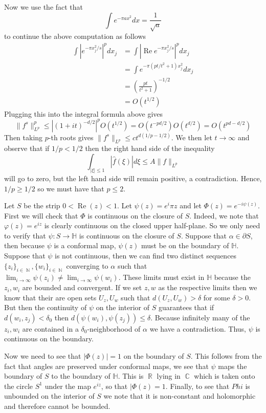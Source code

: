 \documentclass[11pt]{article}
\DeclareMathOperator{\N}{\mathbb{N}}
\DeclareMathOperator{\R}{\mathbb{R}}
\DeclareMathOperator{\C}{\mathbb{C}}
\newcommand{\exercise}[1]{\noindent{\textbf{Exercise #1:}}}
\newcommand{\lpnorm}[2]{\|#1\|_{L^{#2}}}
\newcommand{\real}{\mathrel{\text{Re}}}
\begin{document}
Now we use the fact that
\[
\int e^{-\pi ax^2}dx = \frac{1}{\sqrt{a}}
\]
to continue the above computation as follows
\begin{align*}
  \int \left|e^{-\pi x_j^2/s}\right|^pdx_j &= \int \left|\real e^{-\pi
      x_j^2/s}\right|^pdx_j \\
  &= \int e^{-\pi (pt/t^2+1)x_j^2}dx_j \\
  &= \left(\frac{pt}{t^2+1}\right)^{-1/2}\\
  &= O(t^{1/2})
\end{align*}
Plugging this into the integral formula above gives
\[
\lpnorm{f^s}{p}^p \leq |(1+it)^{-d/2}|^pO(t^{1/2}) =
O(t^{-pd/2})O(t^{d/2}) = O(t^{pd - d/2})
\]
Then taking $p$-th roots gives $\lpnorm{f^s}{p} \leq ct^{d(1/p -
  1/2)}$. We then let $t \to \infty$ and observe that if $1/p < 1/2$
then the right hand side of the inequality
\[
\int_{|\xi| \leq 1} |\hat{f}(\xi)|d\xi \leq A\lpnorm{f}{p}
\]
will go to zero, but the left hand side will remain positive, a
contradiction. Hence, $1/p \geq 1/2$ so we must have that $p \leq 2$.

\exercise{2.7.5}

Let $S$ be the strip $0 < \real (z) < 1$. Let $\psi(z) = e^i\pi z$ and
let $\Phi(z) = e^{-i\psi(z)}$. First we will check that $\Phi$ is
continuous on the closure of $S$. Indeed, we note that $\varphi (z)=
e^{iz}$ is clearly continuous on the closed upper half-plane. So we
only need to verify that $\psi: S \to \mathbb{H}$ is continuous on the
closure of $S$. Suppose that $\alpha \in \partial S$, then because
$\psi$ is a conformal map, $\psi(z)$ must be on the boundary of
$\mathbb{H}$. Suppose that $\psi$ is not continuous, then we can find
two distinct sequences $\{z_i\}_{i \in \N}, \{w_i\}_{i \in \N}$
converging to $\alpha$ such that $\lim_{i \to \infty} \psi(z_i) \neq
\lim_{i \to \infty} \psi(w_i)$. These limits must exist in
$\mathbb{H}$ because the $z_i,w_i$ are bounded and convergent. If we
set $z,w$ as the respective limits then we know that their are open
sets $U_z,U_w$ such that $d(U_z,U_w) > \delta$ for some $\delta >
0$. But then the continuity of $\psi$ on the interior of $S$
guarantees that if $d(w_i,z_j) < \delta_0$ then $d(\psi(w_i),
\psi(z_j)) \leq \delta$. Because infinitely many of the $z_i,w_i$ are
contained in a $\delta_0$-neighborhood of $\alpha$ we have a
contradiction. Thus, $\psi$ is continuous on the boundary.

Now we need to see that $|\Phi(z)| = 1$ on the boundary of $S$. This
follows from the fact that angles are preserved under conformal maps,
we see that $\psi$ maps the boundary of $S$ to the boundary of
$\mathbb{H}$. This is $\R$ lying in $\C$ which is taken onto the
circle $S^1$ under the map $e^{iz}$, so that $|\Phi(z) = 1$. Finally,
to see that $Phi$ is unbounded on the interior of $S$ we note that it
is non-constant and holomorphic and therefore cannot be bounded.
\end{document}
